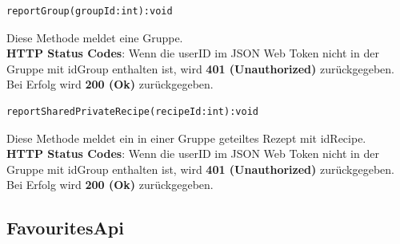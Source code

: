  \begin{lstlisting}
reportGroup(groupId:int):void
\end{lstlisting}
Diese Methode meldet eine Gruppe.\\
\textbf{HTTP Status Codes}:
Wenn die userID im JSON Web Token nicht in der Gruppe mit idGroup enthalten ist, wird \textbf{401 (Unauthorized)} zurückgegeben. Bei Erfolg wird \textbf{200 (Ok)} zurückgegeben.
\vspace{1cm}  
 \begin{lstlisting}
reportSharedPrivateRecipe(recipeId:int):void
\end{lstlisting}
Diese Methode meldet ein in einer Gruppe geteiltes Rezept mit idRecipe.\\
\textbf{HTTP Status Codes}:
Wenn die userID im JSON Web Token nicht in der Gruppe mit idGroup enthalten ist, wird \textbf{401 (Unauthorized)} zurückgegeben. Bei Erfolg wird \textbf{200 (Ok)} zurückgegeben.
\subsection{FavouritesApi}

